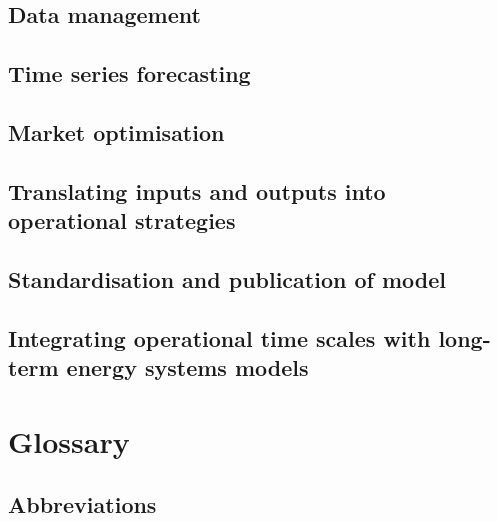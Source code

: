 \hypertarget{data-management}{%
\subsection{Data management}\label{data-management}}

\hypertarget{time-series-forecasting}{%
\subsection{Time series forecasting}\label{time-series-forecasting}}

\hypertarget{market-optimisation}{%
\subsection{Market optimisation}\label{market-optimisation}}

\hypertarget{translating-inputs-and-outputs-into-operational-strategies}{%
\subsection{Translating inputs and outputs into operational
strategies}\label{translating-inputs-and-outputs-into-operational-strategies}}

\hypertarget{standardisation-and-publication-of-model}{%
\subsection{Standardisation and publication of
model}\label{standardisation-and-publication-of-model}}

\hypertarget{integrating-operational-time-scales-with-long-term-energy-systems-models}{%
\subsection{Integrating operational time scales with long-term energy
systems
models}\label{integrating-operational-time-scales-with-long-term-energy-systems-models}}

\hypertarget{glossary}{%
\section{Glossary}\label{glossary}}

\hypertarget{abbreviations}{%
\subsection{Abbreviations}\label{abbreviations}}

